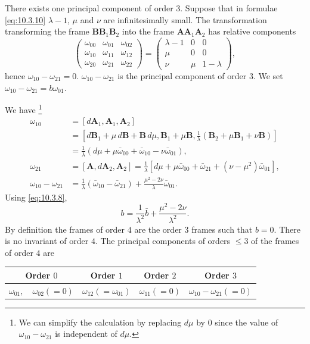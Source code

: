 \documentclass[leqno,11pt]{book}
\numberwithin{equation}{chapter}
\theoremstyle{shape1}
\theoremstyle{shapesmall}
\begin{document}
There exists one principal component of order $3$. Suppose that in formulae \eqref{eq:10.3.10} $\lambda-1$, $\mu$ and $\nu$ are infinitesimally small. The transformation transforming the frame $\mathbf{BB}_{1}\mathbf{B}_{2}$ into the frame $\mathbf{AA}_{1}\mathbf{A}_{2}$ has relative components
\[
\begin{pmatrix}
  \omega_{00}&\omega_{01}&\omega_{02}\\
  \omega_{10}&\omega_{11}&\omega_{12}\\
  \omega_{20}&\omega_{21}&\omega_{22}
\end{pmatrix}=
\begin{pmatrix}
  \lambda-1&0&0\\
  \mu&0&0\\
  \nu&\mu&1-\lambda
\end{pmatrix},
\]
hence $\omega_{10}-\omega_{21}=0$. $\omega_{10}-\omega_{21}$ is the principal component of order $3$. We set $\omega_{10}-\omega_{21}=b\omega_{01}$.

We have \footnote{We can simplify the calculation by replacing $d\mu$ by $0$ since the value of $\omega_{10}-\omega_{21}$ is independent of $d\mu$.}
\begin{align*}
  \omega_{10}&=[d\mathbf{A}_{1},\mathbf{A}_{1},\mathbf{A}_{2}]\\
  &=\left[d\mathbf{B}_{1}+\mu\,d\mathbf{B}+\mathbf{B}\,d\mu,
    \mathbf{B}_{1}+\mu\mathbf{B},
    \frac{1}{\lambda}(\mathbf{B}_{2}+\mu\mathbf{B}_{1}+\nu\mathbf{B})\right]\\
  &=\frac{1}{\lambda}(d\mu+\mu\bar\omega_{00}+\bar\omega_{10}-\nu\bar\omega_{01}),\\
  \omega_{21}&=[\mathbf{A},d\mathbf{A}_{2},\mathbf{A}_{2}]=\frac{1}{\lambda}
  [d\mu+\mu\bar\omega_{00}+\bar\omega_{21}+(\nu-\mu^{2})\bar\omega_{01}],\\
  \omega_{10}-\omega_{21}&=\frac{1}{\lambda}(\bar\omega_{10}-\bar\omega_{21})+\frac{\mu^{2}-2\nu}{\lambda}\bar\omega_{01}.
\end{align*}
Using \eqref{eq:10.3.8},
\begin{equation}
  \label{eq:10.3.11}
  b=\frac{1}{\lambda^{2}}\bar b+\frac{\mu^{2}-2\nu}{\lambda^{2}}.
\end{equation}
By definition the frames of order $4$ are the order $3$ frames such that $b=0$. There is no invariant of order $4$. The principal components of orders $\le 3$ of the frames of order $4$ are
\begin{center}  
  \begin{tabular}{|c|c|c|c|}
    \hline
    Order $0$&Order $1$&Order $2$&Order $3$\\
    \hline
    $\omega_{01},\quad\omega_{02}(=0)$&$\omega_{12}(=\omega_{01})$&$\omega_{11}(=0)$&$\omega_{10}-\omega_{21}(=0)$\\
    \hline
  \end{tabular}
\end{center}
\end{document}

